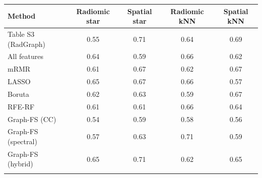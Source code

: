 \begin{tabular}{@{}lcccc@{}}
\toprule
Method & Radiomic star & Spatial star & Radiomic kNN & Spatial kNN \\
\midrule
Table S3 (RadGraph) & 0.55 & 0.71 & 0.64 & 0.69 \\
All features & 0.64 & 0.59 & 0.66 & 0.62 \\
mRMR & 0.61 & 0.67 & 0.62 & 0.67 \\
LASSO & 0.65 & 0.67 & 0.66 & 0.57 \\
Boruta & 0.62 & 0.63 & 0.59 & 0.67 \\
RFE-RF & 0.61 & 0.61 & 0.66 & 0.64 \\
Graph-FS (CC) & 0.54 & 0.59 & 0.58 & 0.56 \\
Graph-FS (spectral) & 0.57 & 0.63 & 0.71 & 0.59 \\
Graph-FS (hybrid) & 0.65 & 0.71 & 0.62 & 0.65 \\
\botrule
\end{tabular}
